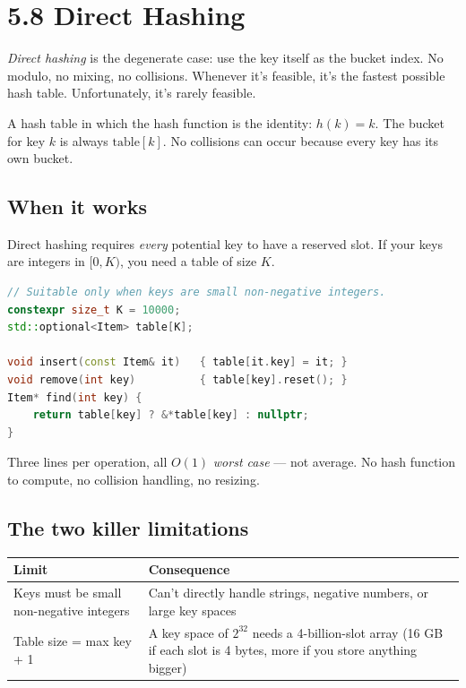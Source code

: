 \documentclass[11pt]{article}
\begin{document}
\section{5.8 Direct Hashing}

\emph{Direct hashing} is the degenerate case: use the key itself
as the bucket index. No modulo, no mixing, no collisions.
Whenever it's feasible, it's the fastest possible hash table.
Unfortunately, it's rarely feasible.

\begin{defnbox}
A hash table in which the hash function is the identity:
$h(k) = k$. The bucket for key $k$ is always $\text{table}[k]$.
No collisions can occur because every key has its own bucket.
\end{defnbox}

\subsection*{When it works}

Direct hashing requires \emph{every} potential key to have a
reserved slot. If your keys are integers in $[0, K)$, you need a
table of size $K$.

\begin{examplebox}
\begin{lstlisting}[language=C++,basicstyle=\ttfamily\small,frame=single]
// Suitable only when keys are small non-negative integers.
constexpr size_t K = 10000;
std::optional<Item> table[K];

void insert(const Item& it)   { table[it.key] = it; }
void remove(int key)          { table[key].reset(); }
Item* find(int key) {
    return table[key] ? &*table[key] : nullptr;
}
\end{lstlisting}
\end{examplebox}

Three lines per operation, all $O(1)$ \emph{worst case} --- not
average. No hash function to compute, no collision handling, no
resizing.

\subsection*{The two killer limitations}

\begin{center}
\begin{tabular}{|l|p{9cm}|}
\hline
\textbf{Limit} & \textbf{Consequence} \\
\hline
Keys must be small non-negative integers & Can't directly handle strings, negative numbers, or large key spaces \\
Table size = max key + 1                 & A key space of $2^{32}$ needs a 4-billion-slot array (16 GB if each slot is 4 bytes, more if you store anything bigger) \\
\hline
\end{tabular}
\end{center}
\end{document}

